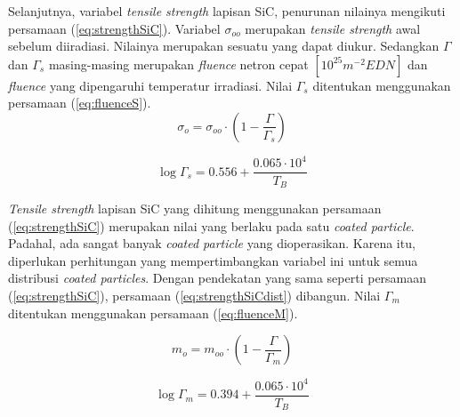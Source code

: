 \documentclass[a4paper,11pt]{report}
\begin{document}
Selanjutnya, variabel \textit{tensile strength} lapisan SiC, penurunan nilainya mengikuti persamaan (\ref{eq:strengthSiC}). Variabel $\sigma_{oo}$ merupakan \textit{tensile strength} awal sebelum diiradiasi. Nilainya merupakan sesuatu yang dapat diukur. Sedangkan $\Gamma$ dan $\Gamma_s$ masing-masing merupakan \textit{fluence} netron cepat $\left[ 10^{25}m^{-2} EDN\right]$ dan \textit{fluence} yang dipengaruhi temperatur irradiasi. Nilai $\Gamma_s$ ditentukan menggunakan persamaan (\ref{eq:fluenceS}). %
\begin{equation}
  \sigma_o = \sigma_{oo} \cdot \left( 1- \frac{\Gamma}{\Gamma_s} \right)
  \label{eq:strengthSiC}
\end{equation}

\begin{equation}
  \log \Gamma_s = 0.556 + \frac{0.065 \cdot 10^4}{T_B}
  \label{eq:fluenceS}
\end{equation}

\textit{Tensile strength} lapisan SiC yang dihitung menggunakan persamaan (\ref{eq:strengthSiC}) merupakan nilai yang berlaku pada satu \textit{coated particle}. Padahal, ada sangat banyak \textit{coated particle} yang dioperasikan. Karena itu, diperlukan perhitungan yang mempertimbangkan variabel ini untuk semua distribusi \textit{coated particles}. Dengan pendekatan yang sama seperti persamaan (\ref{eq:strengthSiC}), persamaan (\ref{eq:strengthSiCdist}) dibangun. Nilai $\Gamma_m$ ditentukan menggunakan persamaan (\ref{eq:fluenceM}).

\begin{equation}
  m_o = m_{oo} \cdot \left( 1- \frac{\Gamma}{\Gamma_m} \right)
  \label{eq:strengthSiCdist}
\end{equation}

\begin{equation}
\log \Gamma_m = 0.394 + \frac{0.065 \cdot 10^4}{T_B}
\label{eq:fluenceM}
\end{equation}

\end{document}
